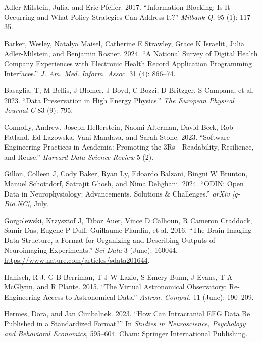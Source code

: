 \documentclass[
  letterpaper,
  DIV=11,
  numbers=noendperiod]{scrartcl}
\newlength{\cslhangindent}
\newenvironment{CSLReferences}[2] %
 {\begin{list}{}{%
  \setlength{\itemindent}{0pt}
  \setlength{\leftmargin}{0pt}
  \setlength{\parsep}{0pt}
  \ifodd #1
   \setlength{\leftmargin}{\cslhangindent}
   \setlength{\itemindent}{-1\cslhangindent}
  \fi
  \setlength{\itemsep}{#2\baselineskip}}}
 {\end{list}}
\begin{document}
\label{refs}
\begin{CSLReferences}{1}{0}
Adler-Milstein, Julia, and Eric Pfeifer. 2017. {``Information Blocking:
Is It Occurring and What Policy Strategies Can Address It?''}
\emph{Milbank Q.} 95 (1): 117--35.

Barker, Wesley, Natalya Maisel, Catherine E Strawley, Grace K Israelit,
Julia Adler-Milstein, and Benjamin Rosner. 2024. {``A National Survey of
Digital Health Company Experiences with Electronic Health Record
Application Programming Interfaces.''} \emph{J. Am. Med. Inform. Assoc.}
31 (4): 866--74.

Basaglia, T, M Bellis, J Blomer, J Boyd, C Bozzi, D Britzger, S Campana,
et al. 2023. {``Data Preservation in High Energy Physics.''} \emph{The
European Physical Journal C} 83 (9): 795.

Connolly, Andrew, Joseph Hellerstein, Naomi Alterman, David Beck, Rob
Fatland, Ed Lazowska, Vani Mandava, and Sarah Stone. 2023. {``{Software}
{Engineering} {Practices} in {Academia}: Promoting the
3Rs---{Readability}, {Resilience}, and {Reuse}.''} \emph{Harvard Data
Science Review} 5 (2).

Gillon, Colleen J, Cody Baker, Ryan Ly, Edoardo Balzani, Bingni W
Brunton, Manuel Schottdorf, Satrajit Ghosh, and Nima Dehghani. 2024.
{``{ODIN}: Open Data in Neurophysiology: Advancements, Solutions \&
Challenges.''} \emph{arXiv {[}q-Bio.NC{]}}, July.

Gorgolewski, Krzysztof J, Tibor Auer, Vince D Calhoun, R Cameron
Craddock, Samir Das, Eugene P Duff, Guillaume Flandin, et al. 2016.
{``The {Brain} {Imaging} {Data} {Structure}, a Format for Organizing and
Describing Outputs of Neuroimaging Experiments.''} \emph{Sci Data} 3
(June): 160044. \url{https://www.nature.com/articles/sdata201644}.

Hanisch, R J, G B Berriman, T J W Lazio, S Emery Bunn, J Evans, T A
McGlynn, and R Plante. 2015. {``The Virtual Astronomical Observatory:
Re-Engineering Access to Astronomical Data.''} \emph{Astron. Comput.} 11
(June): 190--209.

Hermes, Dora, and Jan Cimbalnek. 2023. {``How Can Intracranial {EEG}
Data Be Published in a Standardized Format?''} In \emph{Studies in
Neuroscience, Psychology and Behavioral Economics}, 595--604. Cham:
Springer International Publishing.


\end{CSLReferences}
\end{document}
